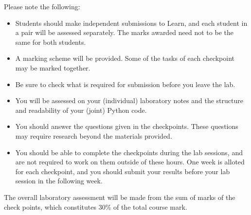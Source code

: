 Please note the following:
\begin{itemize}
\item Students should make independent submissions to Learn, and each student in a pair will be assessed separately. The marks awarded need not to be the same for both students.
\item A marking scheme will be provided. Some of the tasks of each checkpoint may be marked together.
\item Be sure to check what is required for submission before you leave the lab.
\item You will be assessed on your (individual) laboratory notes and the structure and readability of your (joint) Python code.
\item You should answer the questions given in the checkpoints. These questions may require research beyond the materials provided.
\item You should be able to complete the checkpoints during the lab sessions, and are not required to work on them outside of these hours.
One week is alloted for each checkpoint, and you should submit your results before your lab session in the following week.
\end{itemize}

The overall laboratory assessment will be made from the sum of marks of the check points, which constitutes 30\% of the total course mark.

